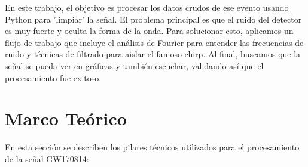 \documentclass[lettersize,journal]{IEEEtran}
\begin{document}
En este trabajo, el objetivo es procesar los datos crudos de ese evento usando Python para 'limpiar' la señal. El problema principal es que el ruido del detector es muy fuerte y oculta la forma de la onda. Para solucionar esto, aplicamos un flujo de trabajo que incluye el análisis de Fourier para entender las frecuencias de ruido y técnicas de filtrado para aislar el famoso chirp. Al final, buscamos que la señal se pueda ver en gráficas y también escuchar, validando así que el procesamiento fue exitoso.

\section{Marco Teórico}
En esta sección se describen los pilares técnicos utilizados para el procesamiento de la señal GW170814:
\end{document}
